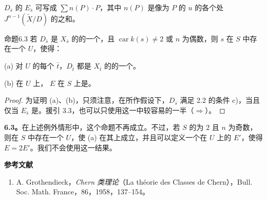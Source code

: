 $D_{\bar s}$ 的 $E_{\bar s}$ 可写成 $\sum n(P)\cdot P$，其中 $n(P)$ 是像为 $P$ 的 $u$ 的各个处 $J^{n-1}(\widetilde X/D)$ 的之和。

\begin{SGAresult}{命题}{6.3}
若 $D_{\bar s}$ 是 $X_{\bar s}$ 的的一个，且 $\operatorname{car}k(s)\ne2$ 或 $n$ 为偶数，则 $s$ 在 $S$ 中存在一个 $U$，使得：

\textup{(a)} 对 $U$ 的每个 $\bar t$，$D_{\bar t}$ 都是 $X_{\bar t}$ 的的一个。

\textup{(b)} 在 $U$ 上， $E$ 在 $S$ 上是。
\end{SGAresult}
\begin{proof}
为证明 (a)、(b)，只须注意，在所作假设下，$D_{\bar s}$ 满足 2.2 的条件 c)，当且仅当 $E_{\bar s}$ 是。援引 3.3，也可以只使用这一中较容易的一半（$\Longrightarrow$）。
\end{proof}

\textbf{6.3。}在上述例外情形中，这个命题不再成立。不过，若 $S$ 的为 $2$ 且 $n$ 为奇数，则在 $S$ 中存在一个 $U$，使 (a) 在其上成立，并且可以定义一个在 $U$ 上的 $E'$，使得 $E=2E'$。我们不会使用这一结果。

\textbf{参考文献}
\begin{enumerate}
\item[{[1]}] A. Grothendieck，\emph{Chern 类理论}（La théorie des Classes de Chern），Bull. Soc. Math. France，86，1958，137--154。
\end{enumerate}

